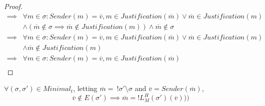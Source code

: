 \begin{proof}
\begin{align}
\implies&\forall m \in \sigma: Sender(m) = \overline{v}, m \in Justification(\overline{m}) \lor \overline{m} \in Justification(m) \\
        &\land (\overline{m} \notin \sigma \implies \overline{m} \notin Justification(m)) \land \overline{m} \notin \sigma \\
\implies&\forall m \in \sigma: Sender(m) = \overline{v}, m \in Justification(\overline{m}) \lor \overline{m} \in Justification(m) \\
        &\land \overline{m} \notin Justification(m) \\
\implies&\forall m \in \sigma: Sender(m) = \overline{v}, m \in Justification(\overline{m})\\
\end{align}
\end{proof}
\fi


\begin{lemma}
$\forall (\sigma, \sigma') \in Minimal_t$, letting $\overline{m} =~!\sigma'\setminus\sigma$ and $\overline{v} = Sender(\overline{m})$,
$$
\overline{v} \notin E(\sigma') \implies \overline{m} = !L^H_M(\sigma')(\overline{v})))
$$
\end{lemma}

